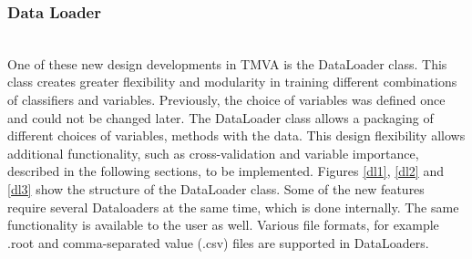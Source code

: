 \documentclass[a4paper]{jpconf}
\begin{document}
\subsubsection{Data Loader}\hspace*{\fill} \\
One of these new design developments in TMVA is the DataLoader class. This class creates greater flexibility and modularity in training different combinations of classifiers and variables. Previously, the choice of variables was defined once and could not be changed later. The DataLoader class allows a packaging of different choices of variables, methods with the data. This design flexibility allows additional functionality, such as cross-validation and variable importance, described in the following sections, to be implemented.\newline
Figures \ref{dl1}, \ref{dl2} and \ref{dl3} show the structure of the DataLoader class. Some of the new features require several Dataloaders at the same time, which is done internally. The same functionality is available to the user as well. Various file formats, for example .root and comma-separated value (.csv) files are supported in DataLoaders.
\end{document}
